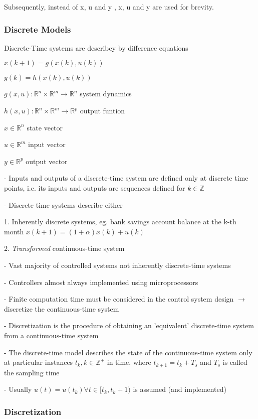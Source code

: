 Subsequently, instead of \Delta x, \Delta u and \Delta y , x, u and y are used for brevity.

\subsubsection{Discrete Models}

Discrete-Time systems are describey by difference equations

$x(k+1) = g(x(k),u(k))$

$y(k) = h(x(k),u(k))$

$g(x,u): \mathbb{R}^n \times \mathbb{R}^m \to \mathbb{R}^n$
system dynamics

$h(x,u): \mathbb{R}^n \times \mathbb{R}^m \to \mathbb{R}^p$
output funtion

$x \in \mathbb{R}^n$
state vector

$u \in \mathbb{R}^m$
input vector

$y \in \mathbb{R}^p$
output vector

- Inputs and outputs of a discrete-time system are defined only at discrete time points,
i.e. its inputs and outputs are sequences defined for $k\in\mathbb{Z}$

- Discrete time systems describe either

1. Inherently discrete systems,
eg. bank savings account balance at the k-th month
$x(k + 1) = (1 + \alpha)x(k) + u(k)$

2. \textit{Transformed} continuous-time system

- Vast majority of controlled systems not inherently discrete-time systems

- Controllers almost always implemented using microprocessors

- Finite computation time must be considered in the control system design
$\rightarrow$ discretize the continuous-time system

- Discretization is the procedure of obtaining an ’equivalent’ discrete-time
system from a continuous-time system

- The discrete-time model describes the state of the continuous-time
system only at particular instances $t_k, k\in\mathbb{Z^+}$ in time, where
$t_{k+1} = t_k + T_s$ and $T_s$ is called the sampling time

- Usually $u(t) = u(t_k) \forall t \in [t_k,t_k+1)$ is assumed (and implemented)

\subsubsection{Discretization}

